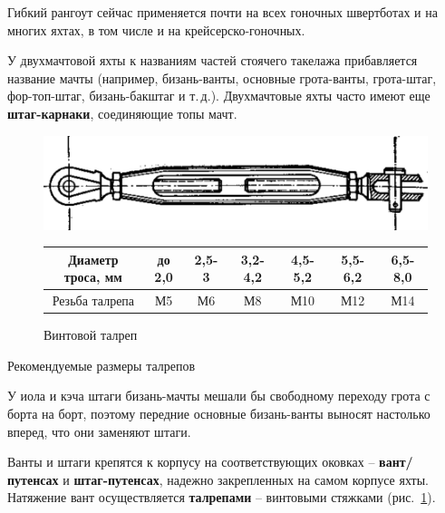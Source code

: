 \documentclass[a4paper, 12pt, twoside, final]{scrbook}
\begin{document}
Гибкий рангоут сейчас применяется почти на всех гоночных швертботах
и на многих яхтах, в том числе и на крейсерско-гоночных.

У двухмачтовой яхты к названиям частей стоячего такелажа прибавляется
название мачты (например, бизань-ванты, основные грота-ванты, грота-штаг,
фор-топ-штаг, бизань-бакштаг и т.\,д.). Двухмачтовые яхты часто имеют
еще \textbf{штаг-карнаки}, соединяющие топы мачт.

\begin{figure}[htbp]
\begin{centering}
\includegraphics{pics/Vintovoj_talrep}
\par\end{centering}

\protect\caption{\label{fig:40}Винтовой талреп}


\bigskip{}


\begin{centering}
\begin{tabular}{|c|c|c|c|c|c|c|}
\hline 
Диаметр троса, мм & до 2,0 & 2,5\-- 3 & 3,2\-- 4,2 & 4,5\-- 5,2 & 5,5\-- 6,2 & 6,5\-- 8,0\tabularnewline
\hline 
Резьба талрепа & М5 & М6 & М8 & М10 & М12 & М14\tabularnewline
\hline 
\end{tabular}
\par\end{centering}


\end{figure}

\begin{table}
\protect\caption{Рекомендуемые размеры талрепов}


\end{table}

У иола и кэча штаги бизань-мачты мешали бы свободному переходу грота
с борта на борт, поэтому передние основные бизань-ванты выносят настолько
вперед, что они заменяют штаги.

Ванты и штаги крепятся к корпусу на соответствующих оковках \--- \textbf{вант\-/путенсах}
и \textbf{штаг-путенсах}, надежно закрепленных на самом корпусе яхты.
Натяжение вант осуществляется \textbf{талрепами} \--- винтовыми стяжками (рис.~\ref{fig:40}).
\end{document}
